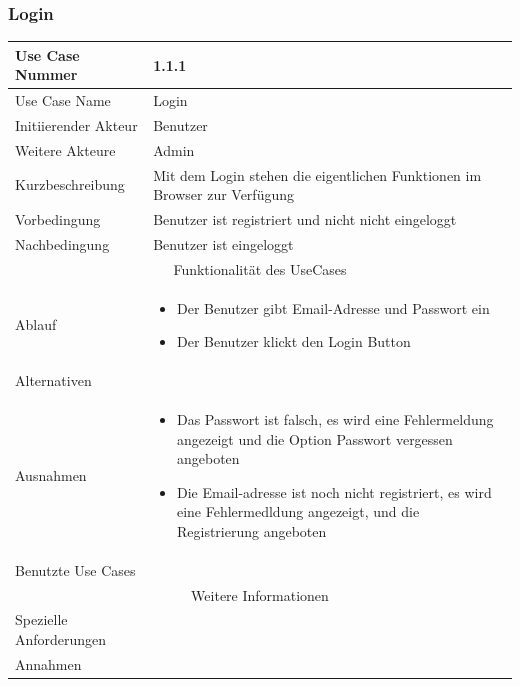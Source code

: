 \documentclass[10pt,a4paper]{article}
\begin{document}
	\subsubsection{Login}
		\begin{tabular}{|l|p{.5\linewidth}|}
		\hline Use Case Nummer & 1.1.1 \\ 
		\hline Use Case Name & Login \\ 
		\hline Initiierender Akteur & Benutzer \\
		\hline Weitere Akteure & Admin \\
		\hline Kurzbeschreibung & Mit dem Login stehen die eigentlichen Funktionen im Browser zur Verf\"ugung \\
		\hline Vorbedingung & Benutzer ist registriert und nicht nicht eingeloggt \\
		\hline Nachbedingung & Benutzer ist eingeloggt \\
		\hline \multicolumn{2}{|c|}{Funktionalität des UseCases}\\
		\hline Ablauf & \begin{itemize}
			\item Der Benutzer gibt Email-Adresse und Passwort ein
			\item Der Benutzer klickt den Login Button
		\end{itemize} \\
		\hline Alternativen &  \\
		\hline Ausnahmen & \begin{itemize}
			\item Das Passwort ist falsch, es wird eine Fehlermeldung angezeigt und die Option Passwort vergessen angeboten
			\item Die Email-adresse ist noch nicht registriert, es wird eine Fehlermedldung angezeigt, und die Registrierung angeboten
		\end{itemize} \\
		\hline Benutzte Use Cases &  \\
		\hline \multicolumn{2}{|c|}{Weitere Informationen} \\
		\hline Spezielle Anforderungen &  \\
		\hline Annahmen &  \\
		\hline
		\end{tabular}
			 
\end{document}
